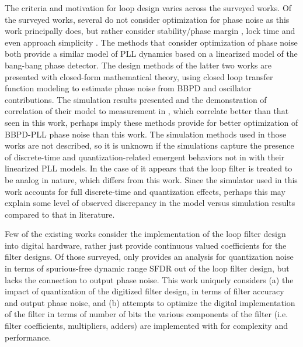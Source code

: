 The criteria and motivation for loop design varies across the surveyed works. Of the surveyed works, several \cite{kratyuk_2007}\cite{kumm_klingbeil_zipf_2010}\cite{chau_chen_2009}\cite{safwat_ghoneima_ismail_2011} do not consider optimization for phase noise as this work principally does, but rather consider stability/phase margin \cite{kratyuk_2007}\cite{kumm_klingbeil_zipf_2010}\cite{safwat_ghoneima_ismail_2011}, lock time \cite{chau_chen_2009}\cite{safwat_ghoneima_ismail_2011} and even approach simplicity \cite{kumm_klingbeil_zipf_2010}. The methods that consider optimization of phase noise \cite{zanuso_2009}\cite{xu_abidi_2017} both provide a similar model of PLL dynamics based on a linearized model of the bang-bang phase detector. The design methods of the latter two works are presented with closed-form mathematical theory, using closed loop transfer function modeling to estimate phase noise from BBPD and oscillator contributions. The simulation results presented and the demonstration of correlation of their model to measurement in \cite{xu_abidi_2017}, which correlate better than that seen in this work, perhaps imply these methods provide for better optimization of BBPD-PLL phase noise than this work. The simulation methods used in those works are not described, so it is unknown if the simulations capture the presence of discrete-time and quantization-related emergent behaviors not in with their linearized PLL models. In the case of \cite{xu_abidi_2017} it appears that the loop filter is treated to be analog in nature, which differs from this work. Since the simulator used in this work accounts for full discrete-time and quantization effects, perhaps this may explain some level of observed discrepancy in the model versus simulation results compared to that in literature. 

Few of the existing works consider the implementation of the loop filter design into digital hardware, rather just provide continuous valued coefficients for the filter designs. Of those surveyed, only \cite{kumm_klingbeil_zipf_2010} provides an analysis for quantization noise in terms of spurious-free dynamic range SFDR out of the loop filter design, but lacks the connection to output phase noise. This work uniquely considers (a) the impact of quantization of the digitized filter design, in terms of filter accuracy and output phase noise, and (b) attempts to optimize the digital implementation of the filter in terms of number of bits the various components of the filter (i.e. filter coefficients, multipliers, adders) are implemented with for complexity and performance.

